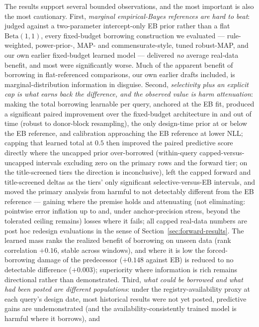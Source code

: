 \documentclass[11pt]{article}
\begin{document}
The results support several bounded observations, and the most important is
also the most cautionary. First, \emph{marginal empirical-Bayes references are
hard to beat}: judged against a two-parameter intercept-only EB prior rather
than a flat $\mathrm{Beta}(1,1)$, every fixed-budget borrowing construction we
evaluated --- rule-weighted, power-prior-, MAP- and commensurate-style, tuned
robust-MAP, and our own earlier fixed-budget learned model --- delivered
\emph{no} average real-data benefit, and most were significantly worse. Much
of the apparent benefit of borrowing in flat-referenced comparisons, our own
earlier drafts included, is marginal-distribution information in disguise.
Second, \emph{selectivity plus an explicit cap is what earns back the
difference, and the observed value is harm attenuation}: making
the total borrowing learnable per query, anchored at the EB fit, produced a
significant paired improvement over the fixed-budget architecture in and out
of time (robust to donor-block resampling), the only design-time prior at or
below the EB reference, and calibration
approaching the EB reference at lower NLL; capping that learned total at
$0.5$ then improved the paired predictive score directly where the
uncapped prior over-borrowed (within-query capped-versus-uncapped
intervals excluding zero on the primary rows and the forward tier; on
the title-screened tiers the direction is inconclusive), left the capped
forward and title-screened deltas as the tiers' only significant
selective-versus-EB intervals, and moved the primary analysis from
harmful to not detectably different from the EB reference --- gaining where
the premise holds and attenuating (not eliminating: pointwise error
inflation up to and, under anchor-precision stress, beyond the tolerated
ceiling remains) losses where it fails; all capped real-data numbers are
post hoc redesign evaluations in the sense of
Section~\ref{sec:forward-results}. The learned
mass ranks
the realized benefit of borrowing on unseen data (rank correlation $+0.16$,
stable across windows), and where it is low the forced-borrowing damage of
the predecessor ($+0.148$ against EB) is reduced to no detectable
difference ($+0.003$); superiority where information is rich remains directional rather
than demonstrated. Third, \emph{what could be borrowed and what had been
posted are different populations}: under the registry-availability proxy at
each query's design date, most historical results were not yet
posted, predictive gains are undemonstrated (and the
availability-consistently trained model is harmful where it borrows), and
\end{document}
